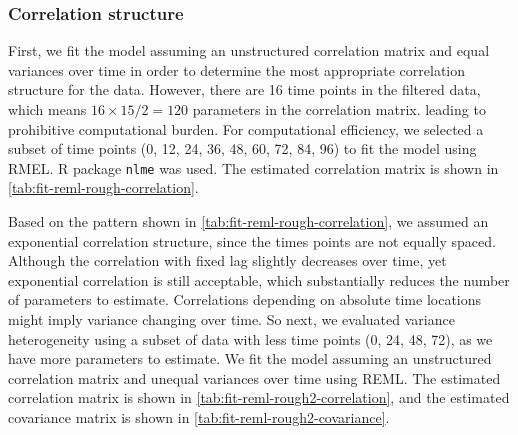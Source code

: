 \documentclass[12pt]{article}
\begin{document}
\subsubsection{Correlation structure}

First, we fit the model assuming
an unstructured correlation matrix and equal variances over time in order to
determine the most appropriate correlation structure for the data.
However, there are 16 time points in the filtered data, which
means $16 \times 15/2 = 120$ parameters in the correlation matrix.
leading to prohibitive computational burden.
For computational efficiency, we selected a subset of time points
(0, 12, 24, 36, 48, 60, 72, 84, 96)
to fit the model using RMEL. R package \texttt{nlme} was used.
The estimated correlation matrix is shown in \cref{tab:fit-reml-rough-correlation}.

\begin{table}[htbp]
  \centering
  \caption{Estimated unstructured correlation matrix}
  \label{tab:fit-reml-rough-correlation}
  
\end{table}

Based on the pattern shown in \cref{tab:fit-reml-rough-correlation},
we assumed an exponential correlation structure,
since the times points are not equally spaced.
Although the correlation with fixed lag slightly decreases over time,
yet exponential correlation is still acceptable, which substantially reduces
the number of parameters to estimate.
Correlations depending on absolute time locations might imply
variance changing over time.
So next, we evaluated variance heterogeneity using a subset of
data with less time points (0, 24, 48, 72),
as we have more parameters to estimate. We fit the model
assuming an unstructured correlation matrix and unequal variances over time
using REML. The estimated correlation matrix is shown in
\cref{tab:fit-reml-rough2-correlation}, and the estimated
covariance matrix
is shown in \cref{tab:fit-reml-rough2-covariance}.

\begin{table}[htbp]
  \centering
  \caption{Estimated unstructured correlation matrix}
  \label{tab:fit-reml-rough2-correlation}
  
\end{table}

\begin{table}[htbp]
  \centering
  \caption{Estimated unstructured covariance matrix}
  \label{tab:fit-reml-rough2-covariance}
  
\end{table}
\end{document}
